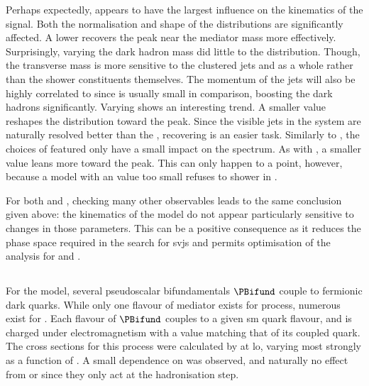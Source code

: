 Perhaps expectedly, \mZprime appears to have the largest influence on the kinematics of the signal. Both the normalisation and shape of the distributions are significantly affected. A lower \mZprime recovers the peak near the mediator mass more effectively. Surprisingly, varying the dark hadron mass did little to the distribution. Though, the transverse mass is more sensitive to the clustered \glspl{jet} and \ptmiss as a whole rather than the shower constituents themselves. The momentum of the \glspl{jet} will also be highly correlated to \mZprime since \mDark is usually small in comparison, boosting the dark hadrons significantly. Varying \rinv shows an interesting trend. A smaller value reshapes the \mT distribution toward the \mZprime peak. Since the visible \glspl{jet} in the system are naturally resolved better than the \ptvecmiss, recovering \mZprime is an easier task. Similarly to \mDark, the choices of \aDark featured only have a small impact on the \mT spectrum. As with \rinv, a smaller value leans more toward the \mZprime peak. This can only happen to a point, however, because a model with an \aDark value too small refuses to shower in \PYTHIA.

For both \mDark and \aDark, checking many other observables leads to the same conclusion given above: the kinematics of the model do not appear particularly sensitive to changes in those parameters. This can be a positive consequence as it reduces the phase space required in the search for \glspl{svj} and permits optimisation of the analysis for \mZprime and \rinv.




\subsection{\texorpdfstring{\tchannel}{t-channel}}
\label{subsec:svj_signal_madgraph_tchannel}

For the \tchannel model, several pseudoscalar bifundamentals $\PBifund$ couple to fermionic dark quarks. While only one flavour of mediator exists for \schannel process, numerous exist for \tchannel. Each flavour of $\PBifund$ couples to a given \acrshort{sm} quark flavour, and is charged under electromagnetism with a value matching that of its coupled quark. The cross sections for this process were calculated by \madgraph at \acrshort{lo}, varying most strongly as a function of \mBifund. A small dependence on \mqdark was observed, and naturally no effect from \aDark or \rinv since they only act at the hadronisation step.

